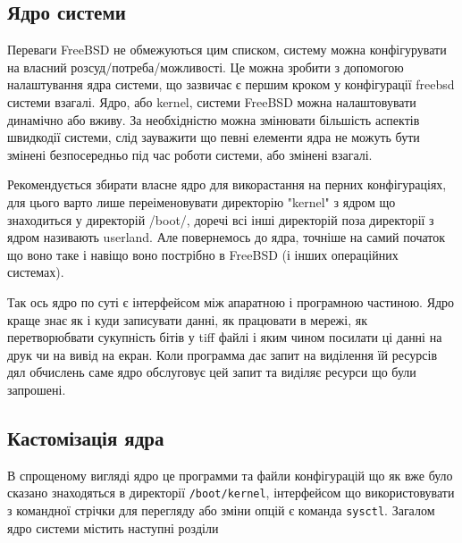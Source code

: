 \begin{itemize}
\subsection{Ядро системи}
Переваги FreeBSD не обмежуються цим списком, систему можна конфігурувати на власний розсуд/потреба/можливості. Це можна зробити з допомогою налаштування ядра системи, що зазвичає є першим кроком у конфігурації freebsd системи взагалі. Ядро, або kernel, системи FreeBSD можна налаштовувати динамічно або вживу. За необхідністю можна змінювати більшість аспектів швидкодії системи, слід зауважити що певні елементи ядра не можуть бути змінені безпосередньо під час роботи системи, або змінені взагалі.

Рекомендується збирати власне ядро для викорастання на перних конфігураціях, для цього варто лише переіменовувати директорію "kernel" з ядром що знаходиться у директорій /boot/, доречі всі інші директорій поза директорії з ядром називають userland. Але повернемось до ядра, точніше на самий початок що воно таке і навіщо воно пострібно в FreeBSD (і інших операційних системах).

Так ось ядро по суті є інтерфейсом між апаратною і програмною частиною. Ядро краще знає як і куди записувати данні, як працювати в мережі, як перетворюбвати сукупність бітів у tiff файлі і яким чином посилати ці данні на друк чи на вивід на екран. Коли программа дає запит на виділення їй ресурсів дял обчислень саме ядро обслуговує цей запит та виділяє ресурси що були запрошені.

\subsection{Кастомізація ядра}
 В спрощеному вигляді ядро це программи та файли конфігурацій що як вже було сказано знаходяться в директорії \texttt{/boot/kernel}, інтерфейсом що використовувати з командної стрічки для перегляду або зміни
опцій є команда \texttt{sysctl}. Загалом ядро системи містить наступні розділи


\end{itemize}
